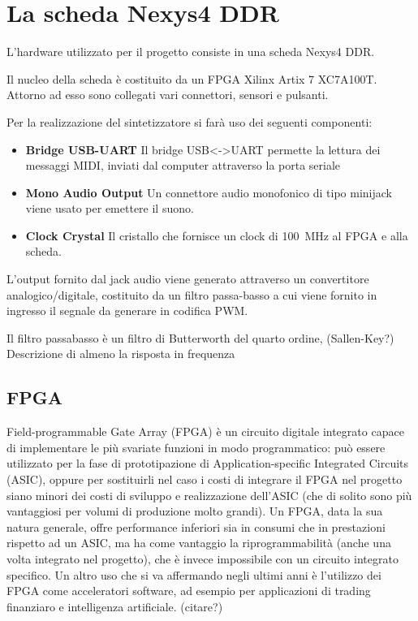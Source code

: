 \chapter{La scheda Nexys4 DDR}

L'hardware utilizzato per il progetto consiste in una scheda Nexys4 DDR.

Il nucleo della scheda è costituito da un FPGA Xilinx Artix 7 XC7A100T.
Attorno ad esso sono collegati vari connettori, sensori e pulsanti.

Per la realizzazione del sintetizzatore si farà uso dei seguenti componenti:
\begin{itemize}
    \item \textbf{Bridge USB-UART} Il bridge USB<->UART permette la lettura
          dei messaggi MIDI, inviati dal computer attraverso la porta seriale
    \item \textbf{Mono Audio Output} Un connettore audio monofonico di tipo minijack 
          viene usato per emettere il suono.
    \item \textbf{Clock Crystal} Il cristallo che fornisce un clock di \SI{100}{\mega\hertz}
          al FPGA e alla scheda.
\end{itemize}

L'output fornito dal jack audio viene generato attraverso un convertitore analogico/digitale,
costituito da un filtro passa-basso a cui viene fornito in ingresso il segnale
da generare in codifica PWM.

Il filtro passabasso è un filtro di Butterworth del quarto ordine, (Sallen-Key?)
Descrizione di almeno la risposta in frequenza


\section{FPGA}
Field-programmable Gate Array (FPGA) è un circuito digitale integrato
capace di implementare le più svariate funzioni in modo programmatico:
può essere utilizzato per la fase di prototipazione di Application-specific
Integrated Circuits (ASIC), oppure per sostituirli nel caso i costi
di integrare il FPGA nel progetto siano minori dei costi di sviluppo
e realizzazione dell'ASIC (che di solito sono più vantaggiosi per volumi
di produzione molto grandi).
Un FPGA, data la sua natura generale, offre performance inferiori sia
in consumi che in prestazioni rispetto ad un ASIC, ma ha come vantaggio
la riprogrammabilità (anche una volta integrato nel progetto), che
è invece impossibile con un circuito integrato specifico. 
Un altro uso che si va affermando negli ultimi anni è l'utilizzo dei
FPGA come acceleratori software, ad esempio per applicazioni di 
trading finanziaro e intelligenza artificiale. (citare?)


